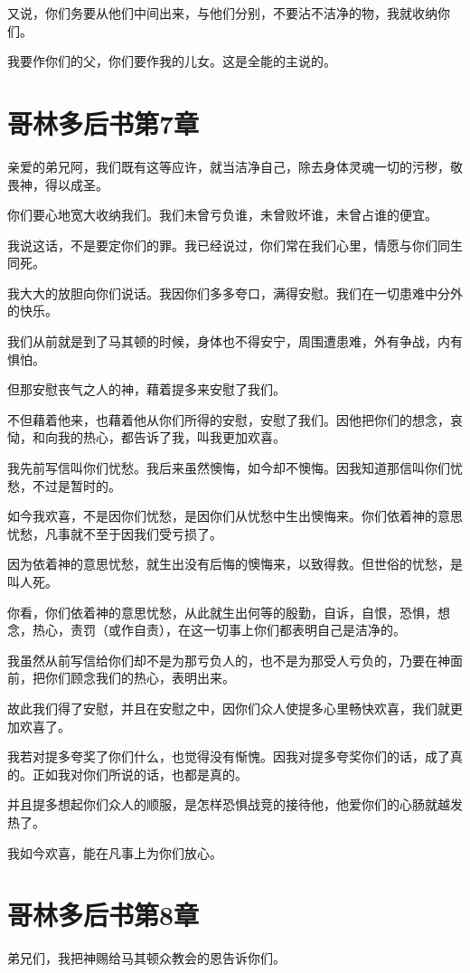 \documentclass[12pt,oneside]{book}
\begin{document}
又说，你们务要从他们中间出来，与他们分别，不要沾不洁净的物，我就收纳你们。

我要作你们的父，你们要作我的儿女。这是全能的主说的。

\chapter{哥林多后书第7章}
亲爱的弟兄阿，我们既有这等应许，就当洁净自己，除去身体灵魂一切的污秽，敬畏神，得以成圣。

你们要心地宽大收纳我们。我们未曾亏负谁，未曾败坏谁，未曾占谁的便宜。

我说这话，不是要定你们的罪。我已经说过，你们常在我们心里，情愿与你们同生同死。

我大大的放胆向你们说话。我因你们多多夸口，满得安慰。我们在一切患难中分外的快乐。

我们从前就是到了马其顿的时候，身体也不得安宁，周围遭患难，外有争战，内有惧怕。

但那安慰丧气之人的神，藉着提多来安慰了我们。

不但藉着他来，也藉着他从你们所得的安慰，安慰了我们。因他把你们的想念，哀恸，和向我的热心，都告诉了我，叫我更加欢喜。

我先前写信叫你们忧愁。我后来虽然懊悔，如今却不懊悔。因我知道那信叫你们忧愁，不过是暂时的。

如今我欢喜，不是因你们忧愁，是因你们从忧愁中生出懊悔来。你们依着神的意思忧愁，凡事就不至于因我们受亏损了。

因为依着神的意思忧愁，就生出没有后悔的懊悔来，以致得救。但世俗的忧愁，是叫人死。

你看，你们依着神的意思忧愁，从此就生出何等的殷勤，自诉，自恨，恐惧，想念，热心，责罚（或作自责），在这一切事上你们都表明自己是洁净的。

我虽然从前写信给你们却不是为那亏负人的，也不是为那受人亏负的，乃要在神面前，把你们顾念我们的热心，表明出来。

故此我们得了安慰，并且在安慰之中，因你们众人使提多心里畅快欢喜，我们就更加欢喜了。

我若对提多夸奖了你们什么，也觉得没有惭愧。因我对提多夸奖你们的话，成了真的。正如我对你们所说的话，也都是真的。

并且提多想起你们众人的顺服，是怎样恐惧战竞的接待他，他爱你们的心肠就越发热了。

我如今欢喜，能在凡事上为你们放心。

\chapter{哥林多后书第8章}
弟兄们，我把神赐给马其顿众教会的恩告诉你们。
\end{document}
